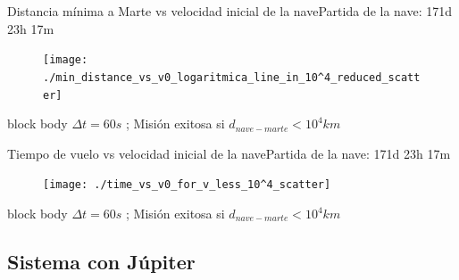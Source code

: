 \documentclass{beamer}
\begin{document}
            \begin{frame}{Distancia mínima a Marte vs velocidad inicial de la nave}{Partida de la nave: 171d 23h 17m}
                \begin{figure}[H!]
                    \texttt{[image: ./min\_distance\_vs\_v0\_logaritmica\_line\_in\_10^4\_reduced\_scatter]}
                    \label{fig:marte_10}
                \end{figure}
                \begin{beamercolorbox}[sep=5pt,center]{block body}
                    \centering
                    \small{$\Delta t = 60s$ ; Misión exitosa si $d_{nave-marte} < 10^4 km$}
                \end{beamercolorbox}
            \end{frame}

            \begin{frame}{Tiempo de vuelo vs velocidad inicial de la nave}{Partida de la nave: 171d 23h 17m}
                \begin{figure}[H!]
                    \texttt{[image: ./time\_vs\_v0\_for\_v\_less\_10^4\_scatter]}
                    \label{fig:marte_11}
                \end{figure}
                \begin{beamercolorbox}[sep=5pt,center]{block body}
                    \centering
                    \small{$\Delta t = 60s$ ; Misión exitosa si $d_{nave-marte} < 10^4 km$}
                \end{beamercolorbox}
            \end{frame}

        \subsection{Sistema con Júpiter}
\end{document}
